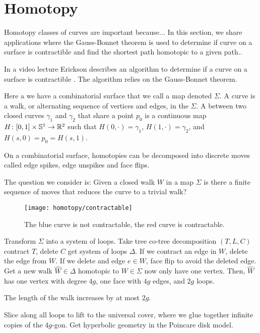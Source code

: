 \section{Homotopy}
\label{sec:homotopy}

Homotopy classes of curves are important  because...
In this section, we share applications
where the Gauss-Bonnet theorem is used to determine
if curve on a surface is contractible and find
the shortest path homotopic to a given path..



In a video lecture Erickson describes an algorithm
to determine if a curve on a surface is contractible \cite{erickson-lecture}.
The algorithm relies on the Gauss-Bonnet theorem.

Here a we have a combinatorial surface that we call a map denoted $\Sigma.$
A curve is a walk, or alternating sequence of vertices
and edges, in the $\Sigma$.
A  between two closed curves $\gamma_1$ and $\gamma_2$ that 
share a point $p_0$ is a continuous map $H\colon [0,1]\times \mathbb{S}^1 \to \mathbb{R}^2$ 
such that $H(0,\cdot)=\gamma_1$, $H(1,\cdot)=\gamma_2$, and $H(s,0)=p_0=H(s,1)$.

On a combinatorial surface, homotopies can be decomposed
into discrete moves called edge spikes, edge unspikes  and face flips.

The question we consider is: Given a closed walk $W$ in a map $\Sigma$ is there a finite
sequence of moves that reduces the curve to a trivial walk?

\begin{figure}[htb]
\centering
\texttt{[image: homotopy/contractable]}
\caption{The blue curve is not contractable, the red curve is contractable.}
\label{fig:contractable}
\end{figure}

Transform $\Sigma$ into a system of loops.  
Take tree co-tree decomposition $(T,L,C)$
contract $T$, delete $C$ get system of loops $\Delta$.
If we contract an edge in $W$, delete the edge from $W$.
If we delete and edge $e\in W$, face flip to avoid the deleted edge.
Get a new walk $\hat{W} \in \Delta$ homotopic to $W\in \Sigma$
now only have one vertex. Then, $\hat{W}$ has one vertex
with degree $4g$, one face with $4g$ edges, and $2g$ loops.

The length of the walk increases by at most $2g$.

Slice along all loops to lift to the universal cover, where we glue
together infinite copies of the $4g$-gon. Get hyperbolic geometry
in the Poincare disk model. 

